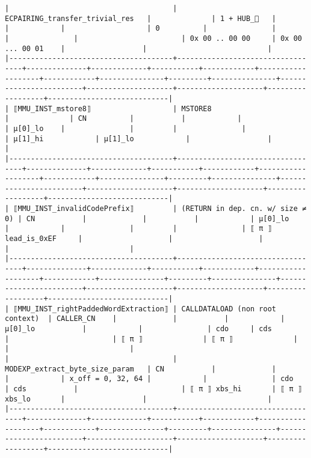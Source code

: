 \documentclass[varwidth=\maxdimen,margin=0.5cm,multi={verbatim}]{standalone}
\begin{document}
\begin{verbatim}
|                                      | ECPAIRING_transfer_trivial_res   |              | 1 + HUB_   |           |            |                   | 0          |               |         |               |                        | 0x 00 .. 00 00     | 0x 00 ... 00 01    |                  |                            |
|--------------------------------------+----------------------------------+--------------+-------------+-----------+------------+-------------------+------------+---------------+---------+---------------+------------------------+--------------------+--------------------+------------------+----------------------------|
| ⟦MMU_INST_mstore8⟧                   | MSTORE8                          |              | CN          |           |            |                   | µ[0]_lo    |               |         |               |                        | µ[1]_hi            | µ[1]_lo            |                  |                            |
|--------------------------------------+----------------------------------+--------------+-------------+-----------+------------+-------------------+------------+---------------+---------+---------------+------------------------+--------------------+--------------------+------------------+----------------------------|
| ⟦MMU_INST_invalidCodePrefix⟧         | (RETURN in dep. cn. w/ size ≠ 0) | CN           |             |           |            | µ[0]_lo           |            |               |         |               | ⟦ π ⟧ lead_is_0xEF     |                    |                    |                  |                            |
|--------------------------------------+----------------------------------+--------------+-------------+-----------+------------+-------------------+------------+---------------+---------+---------------+------------------------+--------------------+--------------------+------------------+----------------------------|
| ⟦MMU_INST_rightPaddedWordExtraction⟧ | CALLDATALOAD (non root context)  | CALLER_CN    |             |           |            | µ[0]_lo           |            |               | cdo     | cds           |                        | ⟦ π ⟧              | ⟦ π ⟧              |                  |                            |
|                                      | MODEXP_extract_byte_size_param   | CN           |             |           |            | x_off = 0, 32, 64 |            |               | cdo     | cds           |                        | ⟦ π ⟧ xbs_hi       | ⟦ π ⟧ xbs_lo       |                  |                            |
|--------------------------------------+----------------------------------+--------------+-------------+-----------+------------+-------------------+------------+---------------+---------+---------------+------------------------+--------------------+--------------------+------------------+----------------------------|

\end{verbatim}
\end{document}
